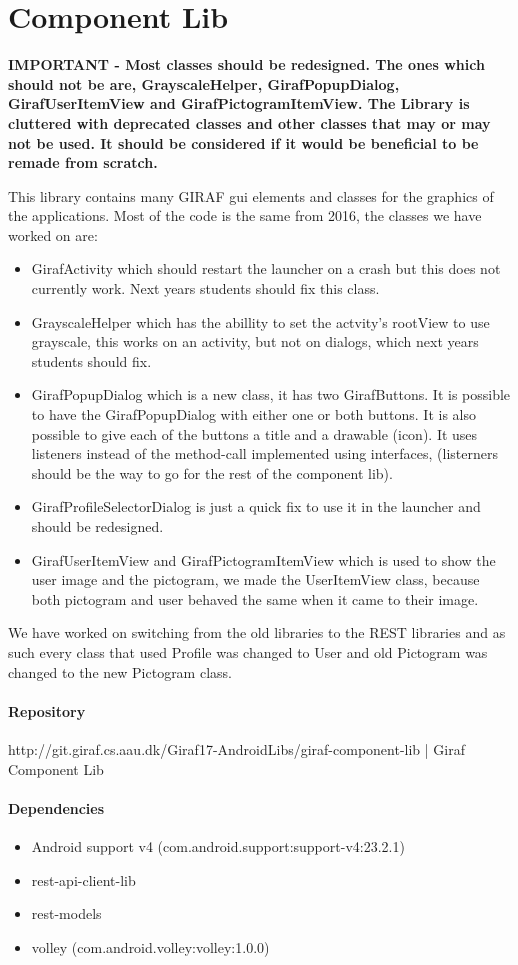 \chapter{Component Lib}\label{WikiCompLib}
\textbf{IMPORTANT - Most classes should be redesigned. The ones which should not
be are, GrayscaleHelper, GirafPopupDialog, GirafUserItemView and
GirafPictogramItemView. The Library is cluttered with deprecated classes and
other classes that may or may not be used. It should be considered if it would
be beneficial to be remade from scratch.}

This library contains many GIRAF gui elements and classes for the graphics of
the applications. Most of the code is the same from 2016, the classes we have
worked on are:

\begin{itemize}
  \item GirafActivity which should restart the launcher on a crash but this
  does not currently work. Next years students should fix this class.
  \item GrayscaleHelper which has the abillity to set the actvity's rootView to
  use grayscale, this works on an activity, but not on dialogs,  which next
  years students should fix.
  \item GirafPopupDialog which is a new class, it has two GirafButtons. It is
  possible to have the GirafPopupDialog with either one or both buttons. It is
  also possible to give each of the buttons a title and a drawable (icon). It
  uses listeners instead of the method-call implemented using interfaces,
  (listerners should be the way to go for the rest of the component lib).
  \item GirafProfileSelectorDialog is just a quick fix to use it in the launcher
  and should be redesigned.
  \item GirafUserItemView and GirafPictogramItemView which is used to show the
  user image and the pictogram,  we made the UserItemView class, because both
  pictogram and user behaved the same when it came to their image.
  
\end{itemize}

We have worked on switching from the old libraries to the REST libraries and as
such every class that used Profile was changed to User and old Pictogram was
changed to the new Pictogram class.

\subsubsection{Repository}
http://git.giraf.cs.aau.dk/Giraf17-AndroidLibs/giraf-component-lib | Giraf Component Lib

\subsubsection{Dependencies}
\begin{itemize}
  \item Android support v4 (com.android.support:support-v4:23.2.1)
  \item rest-api-client-lib
  \item rest-models
  \item volley (com.android.volley:volley:1.0.0)
\end{itemize}

